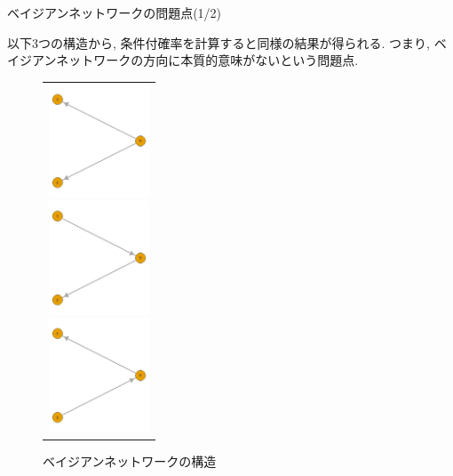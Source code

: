 \documentclass[dvipdfmx]{beamer}
\begin{document}
\begin{frame}{ベイジアンネットワークの問題点(1/2)}

以下3つの構造から, 条件付確率を計算すると同様の結果が得られる. つまり, ベイジアンネットワークの方向に本質的意味がないという問題点.

\begin{figure}[H]
\begin{tabular}{c}
\begin{minipage}{0.33\hsize}
\begin{center}
\includegraphics[clip, width = 3.0cm]{data/BN1.png}
\end{center}
\end{minipage}
\begin{minipage}{0.33\hsize}
\begin{center}
\includegraphics[clip, width = 3.0cm]{data/BN2.png}
\end{center}
\end{minipage}
\begin{minipage}{0.33\hsize}
\begin{center}
\includegraphics[clip, width = 3.0cm]{data/BN3.png}
\end{center}
\end{minipage}
\end{tabular}
\vspace{-0.5zh}
\caption{ベイジアンネットワークの構造}
\label{fig:BN}
\end{figure}

\end{frame}
\end{document}
